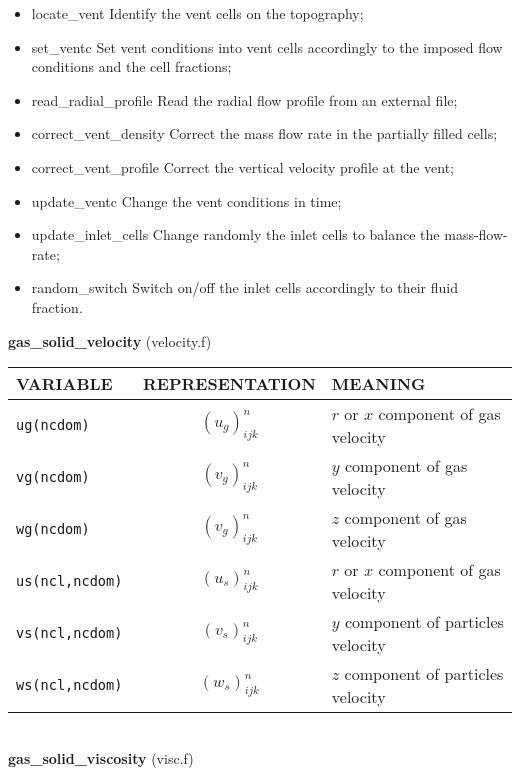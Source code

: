\begin{itemize}
\item {locate\_vent} Identify the vent cells on the topography;
\item {set\_ventc} Set vent conditions into vent cells accordingly to the imposed flow conditions and the cell fractions;
\item {read\_radial\_profile} Read the radial flow profile from an external file;
\item {correct\_vent\_density} Correct the mass flow rate in the partially filled cells;
\item {correct\_vent\_profile} Correct the vertical velocity profile at the vent;
\item {update\_ventc} Change the vent conditions in time;
\item {update\_inlet\_cells} Change randomly the inlet cells to balance the mass-flow-rate;
\item {random\_switch} Switch on/off the inlet cells accordingly to their fluid fraction.
\end{itemize}
%
%
{\large {\bf gas\_solid\_velocity}} (velocity.f)\\[5mm]
\begin{tabular}{|p{6cm}|c|p{6cm}|}\hline
VARIABLE & REPRESENTATION & MEANING\\\hline
\tt ug(ncdom) & $(u_g)^n_{ijk}$ &   $r$ or $x$ component of gas velocity\\\hline
\tt vg(ncdom) & $(v_g)^n_{ijk}$ &  $y$ component of gas velocity\\\hline
\tt wg(ncdom) & $(v_g)^n_{ijk}$ &  $z$ component of gas velocity\\\hline
\tt us(ncl,ncdom) & $(u_s)^n_{ijk}$ &   $r$ or $x$ component of gas velocity\\\hline
\tt vs(ncl,ncdom) & $(v_s)^n_{ijk}$ &  $y$ component of particles velocity\\\hline
\tt ws(ncl,ncdom) & $(w_s)^n_{ijk}$ &  $z$ component of particles velocity\\\hline
\end{tabular}\\[5mm]
%
%
{\large{\bf gas\_solid\_viscosity}} (visc.f)\\[5mm]
